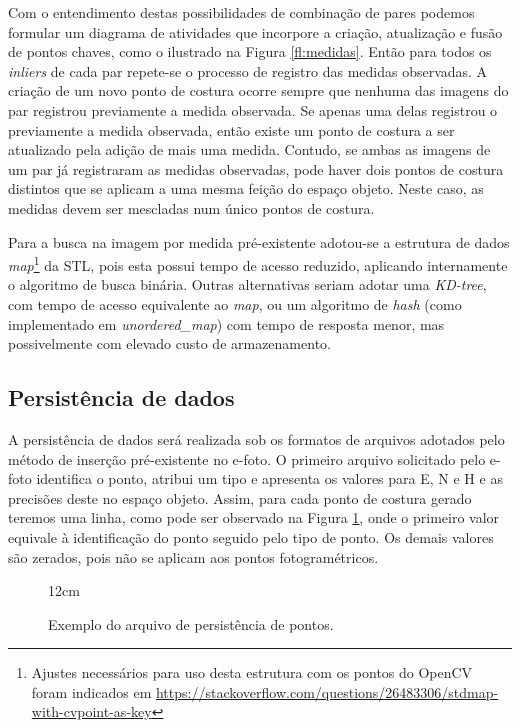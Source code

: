 Com o entendimento destas possibilidades de combinação de pares podemos formular um diagrama de atividades que incorpore a criação, atualização e fusão de pontos chaves, como o ilustrado na Figura \ref{fl:medidas}. Então para todos os \textit{inliers} de cada par repete-se o processo de registro das medidas observadas. A criação de um novo ponto de costura ocorre sempre que nenhuma das imagens do par registrou previamente a medida observada. Se apenas uma delas registrou o previamente a medida observada, então existe um ponto de costura a ser atualizado pela adição de mais uma medida. Contudo, se ambas as imagens de um par já registraram as medidas observadas, pode haver dois pontos de costura distintos que se aplicam a uma mesma feição do espaço objeto. Neste caso, as medidas devem ser mescladas num único pontos de costura. 

Para a busca na imagem por medida pré-existente adotou-se a estrutura de dados \textit{map}\footnote{Ajustes necessários para uso desta estrutura com os pontos do OpenCV foram indicados em \url{https://stackoverflow.com/questions/26483306/stdmap-with-cvpoint-as-key}} da STL, pois esta possui tempo de acesso reduzido, aplicando internamente o algoritmo de busca binária. Outras alternativas seriam adotar uma \textit{KD-tree}, com tempo de acesso equivalente ao \textit{map}, ou um algoritmo de \textit{hash} (como implementado em \textit{unordered\_map}) com tempo de resposta menor, mas possivelmente com elevado custo de armazenamento.


\subsection{Persistência de dados}

A persistência de dados será realizada sob os formatos de arquivos adotados pelo método de inserção pré-existente no e-foto. O primeiro arquivo solicitado pelo e-foto identifica o ponto, atribui um tipo e apresenta os valores para E, N e H e as precisões deste no espaço objeto. Assim, para cada ponto de costura gerado teremos uma linha, como pode ser observado na Figura \ref{exemp_ENH}, onde o primeiro valor equivale à identificação do ponto seguido pelo tipo de ponto. Os demais valores são zerados, pois não se aplicam aos pontos fotogramétricos. 

\begin{figure}[!ht]{12cm}
  \caption{Exemplo do arquivo de persistência de pontos.} \label{exemp_ENH}
\end{figure}

